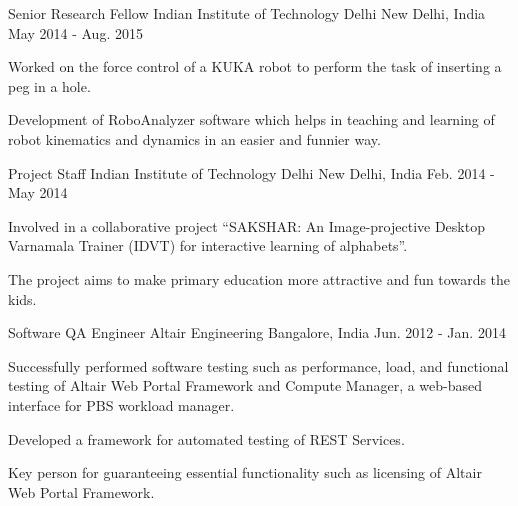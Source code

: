 

\begin{cventries}

  \cventry
  {Senior Research Fellow} %
  {Indian Institute of Technology Delhi} %
  {New Delhi, India} %
  {May 2014 - Aug. 2015} %
  {
    \begin{cvitems} %
      \item {Worked on the force control of a KUKA robot to perform the task of inserting a peg in a hole.}
      \item {Development of RoboAnalyzer software which helps in teaching and learning of robot kinematics and dynamics in an easier and funnier way.}
    \end{cvitems}
  }

  \cventry
  {Project Staff} %
  {Indian Institute of Technology Delhi} %
  {New Delhi, India} %
  {Feb. 2014 - May 2014} %
  {
    \begin{cvitems} %
      \item {Involved in a collaborative project ``SAKSHAR: An Image-projective Desktop Varnamala Trainer (IDVT) for interactive learning of alphabets''.}
      \item {The project aims to make primary education more attractive and fun towards the kids.}
    \end{cvitems}
  }

  \cventry
  {Software QA Engineer} %
  {Altair Engineering} %
  {Bangalore, India} %
  {Jun. 2012 - Jan. 2014} %
  {
    \begin{cvitems} %
      \item {Successfully performed software testing such as performance, load, and functional testing of Altair Web Portal Framework and Compute Manager, a web-based interface for PBS workload manager.}
      \item {Developed a framework for automated testing of REST Services.}
      \item {Key person for guaranteeing essential functionality such as licensing of Altair Web Portal Framework.}
    \end{cvitems}
  }

\end{cventries}
